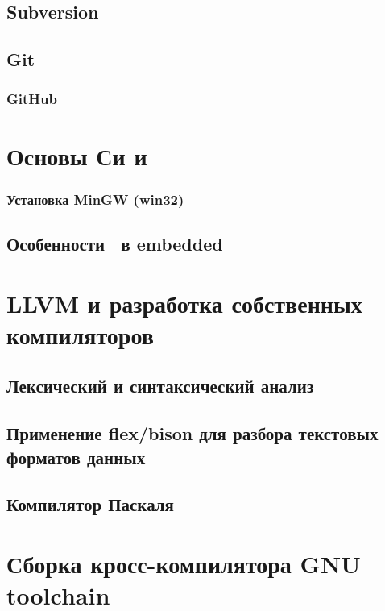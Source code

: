 \section{Subversion}

\section{Git}

\subsection{GitHub}

\chapter{Основы Си и \cpp}

\subsection{Установка MinGW (win32)}

\section{Особенности \cpp\ в embedded}

\chapter{LLVM и разработка собственных компиляторов}

\section{Лексический и синтаксический анализ}

\section{Применение flex/bison для разбора текстовых форматов данных}

\section{Компилятор Паскаля}

\chapter{Сборка кросс-компилятора GNU toolchain}

